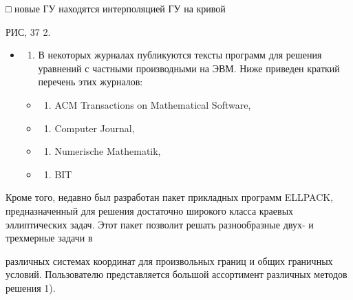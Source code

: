 \documentclass[
  ukrainian,
]{article}
\providecommand{\tightlist}{%
  \setlength{\itemsep}{0pt}\setlength{\parskip}{0pt}}
\begin{document}
□ новые ГУ находятся интерполяцией ГУ на кривой

РИС, 37 2.

\begin{itemize}
\item
  \begin{enumerate}
  \def\labelenumi{\arabic{enumi}.}
  \setcounter{enumi}{6}
  \tightlist
  \item
    В некоторых журналах публикуются тексты программ для решения
    уравнений с частными производными на ЭВМ. Ниже приведен краткий
    перечень этих журналов:
  \end{enumerate}

  \begin{itemize}
  \tightlist
  \item
    \begin{enumerate}
    \def\labelenumi{\alph{enumi})}
    \tightlist
    \item
      ACM Transactions on Mathematical Software,
    \end{enumerate}
  \item
    \begin{enumerate}
    \def\labelenumi{\arabic{enumi})}
    \setcounter{enumi}{5}
    \tightlist
    \item
      Computer Journal,
    \end{enumerate}
  \item
    \begin{enumerate}
    \def\labelenumi{\Alph{enumi})}
    \setcounter{enumi}{1}
    \tightlist
    \item
      Numerische Mathematik,
    \end{enumerate}
  \item
    \begin{enumerate}
    \def\labelenumi{\alph{enumi})}
    \setcounter{enumi}{17}
    \tightlist
    \item
      BIT
    \end{enumerate}
  \end{itemize}
\end{itemize}

Кроме того, недавно был разработан пакет прикладных программ ELLPACK,
предназначенный для решения достаточно широкого класса краевых
эллиптических задач. Этот пакет позволит решать разнообразные двух- и
трехмерные задачи в

различных системах координат для произвольных границ и общих граничных
условий. Пользователю представляется большой ассортимент различных
методов решения 1).
\end{document}

